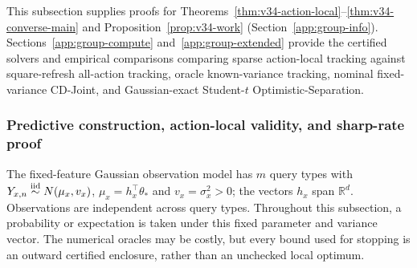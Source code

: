 \documentclass{article}
\theoremstyle{plain}
\theoremstyle{definition}
\begin{document}
This subsection supplies proofs for Theorems~\ref{thm:v34-action-local}--\ref{thm:v34-converse-main} and Proposition~\ref{prop:v34-work} (Section~\ref{app:group-info}). Sections~\ref{app:group-compute} and~\ref{app:group-extended} provide the certified solvers and empirical comparisons comparing sparse action-local tracking against square-refresh all-action tracking, oracle known-variance tracking, nominal fixed-variance CD-Joint, and Gaussian-exact Student-$t$ Optimistic-Separation.


\subsubsection{Predictive construction, action-local validity, and sharp-rate proof}
\label{app:v34-predictor}

The fixed-feature Gaussian observation model has $m$ query types with
$Y_{x,n}\stackrel{\rm iid}{\sim}N(\mu_x,v_x)$,
$\mu_x=h_x^\top\theta_*$ and $v_x=\sigma_x^2>0$; the
vectors $h_x$ span $\mathbb R^d$. Observations are independent across
query types. Throughout this subsection, a probability or expectation
is taken under this fixed parameter and variance vector. The numerical
oracles may be costly, but every bound used for stopping is an outward
certified enclosure, rather than an unchecked local optimum.
\end{document}
